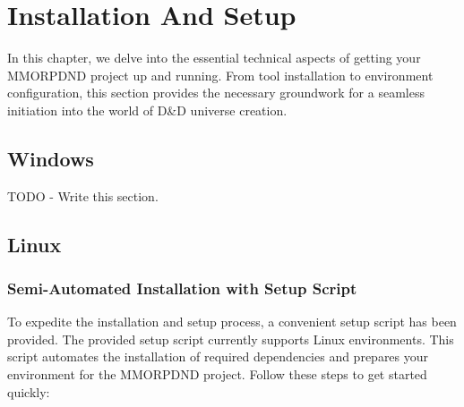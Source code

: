 \chapter{Installation And Setup}
\thispagestyle{fancy}  %

In this chapter, we delve into the essential technical aspects of getting your MMORPDND project up and running. From tool installation to environment configuration, this section provides the necessary groundwork for a seamless initiation into the world of D\&D universe creation.

\section{Windows}

TODO - Write this section.

\section{Linux}

\subsection{Semi-Automated Installation with Setup Script}

To expedite the installation and setup process, a convenient setup script has been provided. The provided setup script currently supports Linux environments. This script automates the installation of required dependencies and prepares your environment for the MMORPDND project. Follow these steps to get started quickly:

